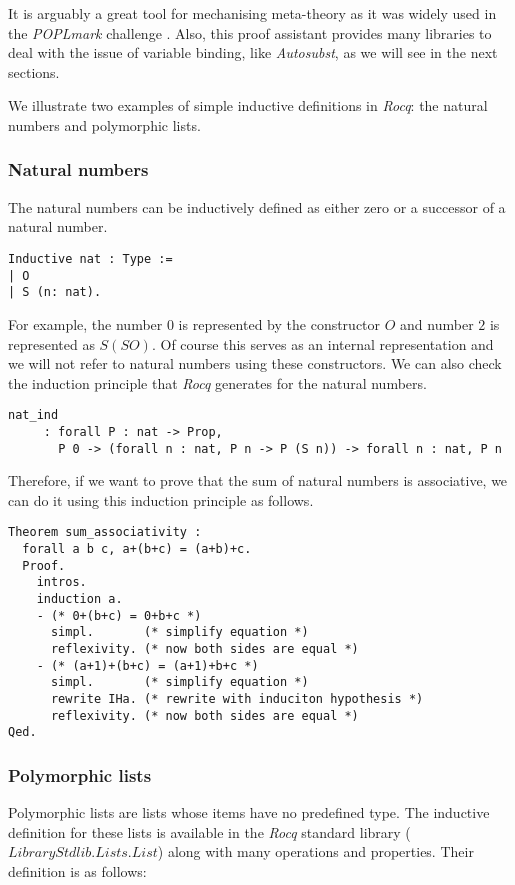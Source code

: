 It is arguably a great tool for mechanising meta-theory as it was widely used in the \textit{POPLmark} challenge \cite{POPLmark}.
Also, this proof assistant provides many libraries to deal with the issue of variable binding, like \textit{Autosubst}, as we will see in the next sections.

We illustrate two examples of simple inductive definitions in \textit{Rocq}: the natural numbers and polymorphic lists.

\subsubsection{Natural numbers}
The natural numbers can be inductively defined as either zero or a successor of a natural number.
\begin{lstlisting}[language=Coq]
Inductive nat : Type :=
| O
| S (n: nat).
\end{lstlisting}

For example, the number $0$ is represented by the constructor \lst$O$ and number $2$ is represented as \lst$S (S O)$.
Of course this serves as an internal representation and we will not refer to natural numbers using these constructors.
We can also check the induction principle that \textit{Rocq} generates for the natural numbers.
\begin{lstlisting}[language=Coq]
  nat_ind
     : forall P : nat -> Prop,
       P 0 -> (forall n : nat, P n -> P (S n)) -> forall n : nat, P n
\end{lstlisting}

Therefore, if we want to prove that the sum of natural numbers is associative, we can do it using this induction principle as follows.
\begin{lstlisting}[language=Coq]
Theorem sum_associativity :
  forall a b c, a+(b+c) = (a+b)+c.
  Proof.
    intros.
    induction a.
    - (* 0+(b+c) = 0+b+c *)
      simpl.       (* simplify equation *)
      reflexivity. (* now both sides are equal *)        
    - (* (a+1)+(b+c) = (a+1)+b+c *)
      simpl.       (* simplify equation *)
      rewrite IHa. (* rewrite with induciton hypothesis *)
      reflexivity. (* now both sides are equal *)
Qed.
\end{lstlisting}

\subsubsection{Polymorphic lists}
Polymorphic lists are lists whose items have no predefined type.
The inductive definition for these lists is available in the \textit{Rocq} standard library (\lst$Library Stdlib.Lists.List$) along with many operations and properties.
Their definition is as follows: 

